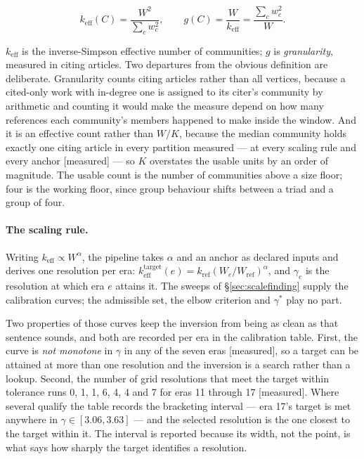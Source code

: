 \documentclass[11pt]{article}
\newcommand{\meas}{{\footnotesize\textsf{[measured]}}}
\begin{document}
\[
	k_{\mathrm{eff}}(C) = \frac{W^{2}}{\sum_c w_c^{2}},
	\qquad
	g(C) = \frac{W}{k_{\mathrm{eff}}} = \frac{\sum_c w_c^{2}}{W} .
\]

$k_{\mathrm{eff}}$ is the inverse-Simpson effective number of communities; $g$ is
\emph{granularity}, measured in citing articles. Two departures from the obvious definition
are deliberate. Granularity counts citing articles rather than all vertices, because a
cited-only work with in-degree one is assigned to its citer's community by arithmetic and
counting it would make the measure depend on how many references each community's members
happened to make inside the window. And it is an effective count rather than $W/K$, because
the median community holds exactly one citing article in every partition measured --- at
every scaling rule and every anchor \meas{} --- so $K$ overstates the usable units by an
order of magnitude. The usable count is the number of communities above a size floor; four is
the working floor, since group behaviour shifts between a triad and a group of four.

\paragraph{The scaling rule.} Writing $k_{\mathrm{eff}} \propto W^{\alpha}$, the pipeline
takes $\alpha$ and an anchor as declared inputs and derives one resolution per era:
$k_{\mathrm{eff}}^{\text{target}}(e) = k_{\mathrm{ref}}(W_e/W_{\mathrm{ref}})^{\alpha}$, and
$\gamma_e$ is the resolution at which era $e$ attains it. The sweeps of
\S\ref{sec:scalefinding} supply the calibration curves; the admissible set, the elbow
criterion and $\gamma^{*}$ play no part.

Two properties of those curves keep the inversion from being as clean as that sentence
sounds, and both are recorded per era in the calibration table. First, the curve is
\emph{not monotone} in $\gamma$ in any of the seven eras \meas{}, so a target can be attained
at more than one resolution and the inversion is a search rather than a lookup. Second, the
number of grid resolutions that meet the target within tolerance runs 0, 1, 1, 6, 4, 4 and 7
for eras 11 through 17 \meas{}. Where several qualify the table records the bracketing
interval --- era 17's target is met anywhere in $\gamma \in [3.06, 3.63]$ --- and the
selected resolution is the one closest to the target within it. The interval is reported
because its width, not the point, is what says how sharply the target identifies a
resolution.
\end{document}
